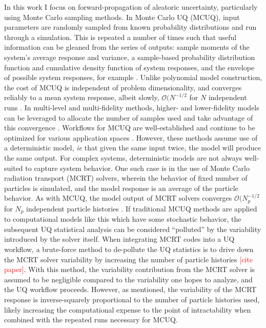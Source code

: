 In this work I focus on forward-propagation of aleatoric uncertainty, particularly using Monte Carlo sampling methods. In Monte Carlo UQ (MCUQ), input parameters are randomly sampled from known probability distributions and run through a simulation. This is repeated a number of times such that useful information can be gleaned from the series of outputs: sample moments of the system's average response and variance, a sample-based probability distribution function and cumulative density function of system responses, and the envelope of possible system responses, for example \cite{wildey-presentation}. Unlike polynomial model construction, the cost of MCUQ is independent of problem dimensionality, and converges reliably to a mean system response, albeit slowly, $\mathcal{O}(N^{-1/2}$ for $N$ independent runs \cite{mcnp}. In multi-level and multi-fidelity methods, higher- and lower-fidelity models can be leveraged to allocate the number of samples used and take advantage of this convergence \cite{wildey-presentation}. Workflows for MCUQ are well-established and continue to be optimized for various application spaces \cite{zhang-survey}. However, these methods assume use of a deterministic model, \textit{ie} that given the same input twice, the model will produce the same output. For complex systems, deterministic models are not always well-suited to capture system behavior. One such case is in the use of Monte Carlo radiation transport (MCRT) solvers, wherein the behavior of fixed number of particles is simulated, and the model response is an average of the particle behavior. As with MCUQ, the model output of MCRT solvers converges $\mathcal{O}(N_p^{-1/2}$ for $N_p$ independent particle histories \cite{mcnp}. If traditional MCUQ methods are applied to computational models like this which have some stochastic behavior, the subsequent UQ statistical analysis can be considered ``polluted'' by the variability introduced by the solver itself. When integrating MCRT codes into a UQ workflow, a brute-force method to de-pollute the UQ statistics is to drive down the MCRT solver variability by increasing the number of particle histories \textcolor{red}{[cite paper]}. With this method, the variability contribution from the MCRT solver is assumed to be negligible compared to the variability one hopes to analyze, and the UQ workflow proceeds. However, as mentioned, the variability of the MCRT response is inverse-squarely proportional to the number of particle histories used, likely increasing the computational expense to the point of intractability when combined with the repeated runs necessary for MCUQ. 


